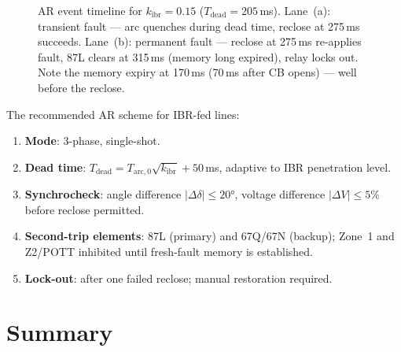 \documentclass[11pt,a4paper]{article}
\begin{document}
\begin{figure}[htbp]
  \centering
  \resizebox{0.90\textwidth}{!}{}
  \caption{AR event timeline for $k_\mathrm{ibr}=0.15$
           ($T_\mathrm{dead}=205$\,ms).  Lane~(a): transient fault ---
           arc quenches during dead time, reclose at 275\,ms succeeds.
           Lane~(b): permanent fault --- reclose at 275\,ms re-applies fault,
           87L clears at 315\,ms (memory long expired), relay locks out.
           Note the memory expiry at 170\,ms (70\,ms after CB opens) ---
           well before the reclose.}
  \label{fig:timeline}
\end{figure}

\noindent
The recommended AR scheme for IBR-fed lines:
\begin{enumerate}
  \item \textbf{Mode}: 3-phase, single-shot.
  \item \textbf{Dead time}: $T_\mathrm{dead}=T_\mathrm{arc,0}\sqrt{k_\mathrm{ibr}}
    + 50$\,ms, adaptive to IBR penetration level.
  \item \textbf{Synchrocheck}: angle difference $|\Delta\delta|\leq20°$,
    voltage difference $|\Delta V|\leq5\%$ before reclose permitted.
  \item \textbf{Second-trip elements}: 87L (primary) and 67Q/67N (backup);
    Zone~1 and Z2/POTT inhibited until fresh-fault memory is established.
  \item \textbf{Lock-out}: after one failed reclose; manual restoration required.
\end{enumerate}

\section{Summary}
\label{sec:summary}
\end{document}

